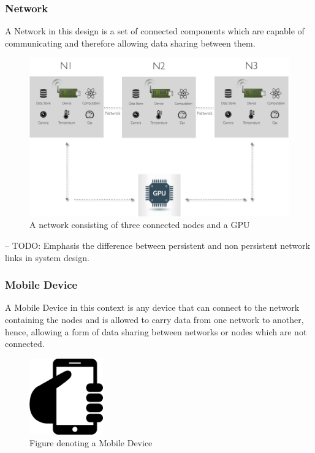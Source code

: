 \subsubsection{Network}
\label{subsub:network}
A Network in this design is a set of connected components which are capable of communicating and therefore allowing data sharing between them.
\begin{figure}[H]
	\centering
	\includegraphics[scale=0.4]{images/network.png}
	\caption{A network consisting of three connected nodes and a GPU}
	\label{fig:network}
\end{figure}
-- TODO: 
Emphasis the difference between persistent and non persistent network links in system design.

\subsubsection{Mobile Device}
A Mobile Device in this context is any device that can connect to the network containing the nodes and is allowed to  carry data from one network to another, hence, allowing a form of data sharing between networks or nodes which are not connected.

\begin{figure}[H]
	\centering
	\includegraphics[scale=0.3]{images/mobile.png}
	\caption{Figure denoting a Mobile Device}
	\label{fig:mobile}
\end{figure}




